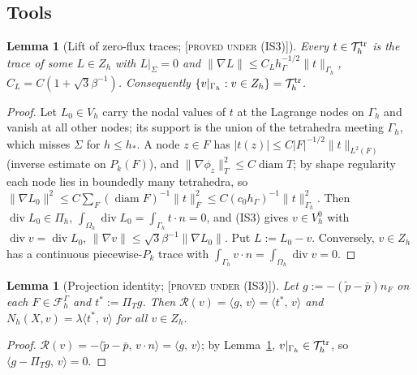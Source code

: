 \documentclass[11pt,reqno]{amsart}
\theoremstyle{plain}
\newtheorem{lemma}[theorem]{Lemma}
\theoremstyle{definition}
\newcommand{\status}[1]{\textup{\textsc{[#1]}}}
\newcommand{\hG}{h_\Gamma}
\newcommand{\Gh}{\Gamma_h}
\newcommand{\Oh}{\Omega_h}
\newcommand{\FG}{\mathcal F_h^\Gamma}
\newcommand{\Vh}{V_h}
\newcommand{\VO}{V_h^0}
\newcommand{\Pih}{\Pi_h}
\newcommand{\Zh}{Z_h}
\newcommand{\pt}{\tilde p}
\newcommand{\pbar}{\bar p}
\newcommand{\ip}[2]{\langle #1,\, #2\rangle}
\newcommand{\norm}[1]{\lVert #1\rVert}
\renewcommand{\div}{\operatorname{div}}
\newcommand{\Rc}{\mathcal R}
\newcommand{\Tr}{\mathcal T^{\rm tr}_h}
\DeclareMathOperator{\diam}{diam}
\begin{document}
\subsection{Tools}
\begin{lemma}[Lift of zero-flux traces; \status{proved under (IS3)}]\label{A:lift}
Every $t\in\Tr$ is the trace of some $L\in\Zh$ with $L|_\Sigma=0$ and $\norm{\nabla L}\le C_L\hG^{-1/2}\norm t_{\Gh}$, $C_L=C(1+\sqrt3\beta^{-1})$. Consequently $\{v|_{\Gh}:v\in\Zh\}=\Tr$.
\end{lemma}
\begin{proof}
Let $L_0\in\Vh$ carry the nodal values of $t$ at the Lagrange nodes on $\Gh$ and vanish at all other nodes; its support is the union of the tetrahedra meeting $\Gh$, which misses $\Sigma$ for $h\le h_\ast$. A node $z\in F$ has $|t(z)|\le C|F|^{-1/2}\norm t_{L^2(F)}$ (inverse estimate on $P_k(F)$), and $\norm{\nabla\phi_z}^2_T\le C\diam T$; by shape regularity each node lies in boundedly many tetrahedra, so $\norm{\nabla L_0}^2\le C\sum_F(\diam F)^{-1}\norm t^2_F\le C(c_0\hG)^{-1}\norm t^2_{\Gh}$. Then $\div L_0\in\Pih$, $\int_{\Oh}\div L_0=\int_{\Gh}t\cdot n=0$, and (IS3) gives $v\in\VO$ with $\div v=\div L_0$, $\norm{\nabla v}\le\sqrt3\beta^{-1}\norm{\nabla L_0}$. Put $L:=L_0-v$. Conversely, $v\in\Zh$ has a continuous piecewise-$P_k$ trace with $\int_{\Gh}v\cdot n=\int_{\Oh}\div v=0$.
\end{proof}

\begin{lemma}[Projection identity; \status{proved under (IS3)}]\label{A:proj}
Let $g:=-(\pt-\pbar)n_F$ on each $F\in\FG$ and $t^\ast:=\Pi_Tg$. Then $\Rc(v)=\ip gv=\ip{t^\ast}v$ and $N_h(X,v)=\lambda\ip{t^\ast}v$ for all $v\in\Zh$.
\end{lemma}
\begin{proof}
$\Rc(v)=-\ip{\pt-\pbar}{v\cdot n}=\ip gv$; by Lemma~\ref{A:lift}, $v|_{\Gh}\in\Tr$, so $\ip{g-\Pi_Tg}v=0$.
\end{proof}
\end{document}
